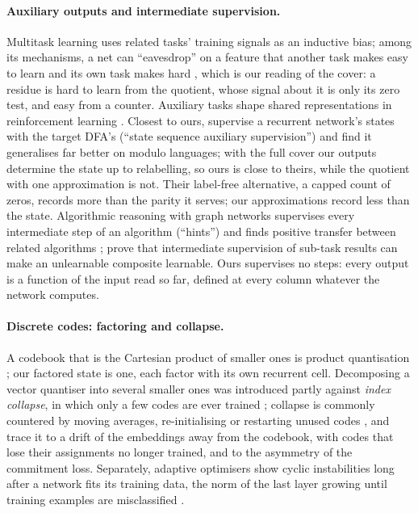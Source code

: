 \documentclass[11pt]{article}
\begin{document}
\paragraph{Auxiliary outputs and intermediate supervision.} Multitask learning uses related tasks'
training signals as an inductive bias; among its mechanisms, a net can ``eavesdrop'' on a feature
that another task makes easy to learn and its own task makes hard
\citep{caruana-1997-multitask-learning}, which is our reading of the cover: a residue is hard to
learn from the quotient, whose signal about it is only its zero test, and easy from a counter.
Auxiliary tasks shape shared representations in reinforcement learning
\citep{jaderberg-2017-unsupervised-auxiliary-tasks}. Closest to ours,
\citet{dan-2022-robust-generalization-regular-languages} supervise a recurrent network's states with
the target DFA's (``state sequence auxiliary supervision'') and find it generalises far better on
modulo languages; with the full cover our outputs determine the state up to relabelling, so ours is
close to theirs, while the quotient with one approximation is not. Their label-free alternative, a
capped count of zeros, records more than the parity it serves; our approximations record less than
the state. Algorithmic reasoning with graph networks supervises every intermediate step of an
algorithm (``hints'') and finds positive transfer between related algorithms
\citep{velickovic-2020-neural-execution-graph-algorithms,velickovic-2022-clrs-algorithmic-reasoning-benchmark,ibarz-2022-generalist-neural-algorithmic-learner};
\citet{wies-2023-sub-task-decomposition-sequence-tasks} prove that intermediate supervision of
sub-task results can make an unlearnable composite learnable. Ours supervises no steps: every output
is a function of the input read so far, defined at every column whatever the network computes.

\paragraph{Discrete codes: factoring and collapse.} A codebook that is the Cartesian product of
smaller ones is product quantisation \citep{jegou-2011-product-quantization-nearest-neighbor}; our
factored state is one, each factor with its own recurrent cell. Decomposing a vector quantiser into
several smaller ones was introduced partly against \emph{index collapse}, in which only a few codes
are ever trained \citep{kaiser-2018-fast-decoding-discrete-latent-variables}; collapse is commonly
countered by moving averages, re-initialising or restarting unused codes
\citep{lancucki-2020-robust-training-vq-bottleneck,dhariwal-2020-jukebox,zheng-2023-online-clustered-codebook},
and \citet{huh-2023-straightening-straight-through-estimator} trace it to a drift of the embeddings
away from the codebook, with codes that lose their assignments no longer trained, and to the
asymmetry of the commitment loss. Separately, adaptive optimisers show cyclic instabilities long
after a network fits its training data, the norm of the last layer growing until training examples
are misclassified \citep{thilak-2022-slingshot-mechanism-adaptive-optimizers}.
\end{document}
